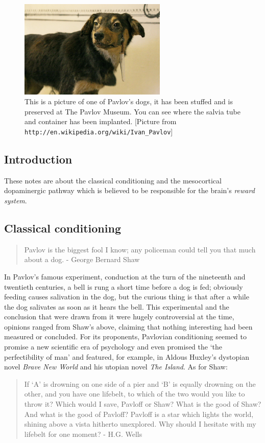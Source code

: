 \documentclass[11pt,a4paper]{scrartcl}
\begin{document}
\begin{figure}
\begin{center}
\includegraphics[width=7cm]{One_of_Pavlovs_dogs.jpg}%
\end{center}
\caption{This is a picture of one of Pavlov's dogs, it has been stuffed and is preserved at The Pavlov Museum. You can see where the salvia tube and container has been implanted. [Picture from \texttt{http://en.wikipedia.org/wiki/Ivan\_Pavlov}]}
\end{figure}


\subsection*{Introduction}
These notes are about the classical conditioning and the mesocortical
dopaminergic pathway which is believed to be responsible for the
brain's \textsl{reward system}. 

\subsection*{Classical conditioning}

\begin{quote}
Pavlov is the biggest fool I know; any policeman could tell you that much
about a dog. - George Bernard Shaw
\end{quote}

In Pavlov's famous experiment, conduction at the turn of the
nineteenth and twentieth centuries, a bell is rung a short time before
a dog is fed; obviously feeding causes salivation in the dog, but the
curious thing is that after a while the dog salivates as soon as it
hears the bell. This experimental and the conclusion that were drawn
from it were hugely controversial at the time, opinions ranged from
Shaw's above, claiming that nothing interesting had been measured or
concluded.  For its proponents, Pavlovian conditioning seemed to
promise a new scientific era of psychology and even promised the
\lq{}the perfectibility of man\rq{} and featured, for example, in
Aldous Huxley's dystopian novel \textsl{Brave New World} and his
utopian novel \textsl{The Island}. As for Shaw:
\begin{quote}
If ‘A’ is drowning on one side of a pier and ‘B’ is equally drowning on the
other, and you have one lifebelt, to which of the two would you like to throw
it? Which would I save, Pavloff or Shaw? What is the good of Shaw? And
what is the good of Pavloff? Pavloff is a star which lights the world, shining
above a vista hitherto unexplored. Why should I hesitate with my lifebelt for
one moment? - H.G. Wells
\end{quote}
\end{document}
